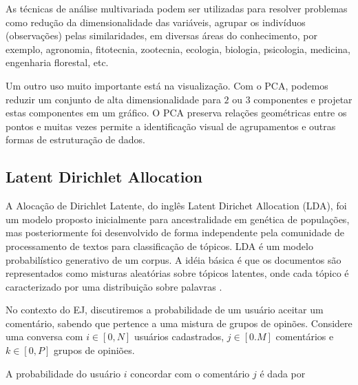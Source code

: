 
As técnicas de análise multivariada podem ser
utilizadas para resolver problemas como redução da dimensionalidade das variáveis, agrupar os
indivíduos (observações) pelas
similaridades, em diversas áreas do
conhecimento, por exemplo, agronomia,
fitotecnia, zootecnia, ecologia, biologia,
psicologia, medicina, engenharia florestal,
etc.

Um outro uso muito importante está na visualização. Com o PCA, podemos reduzir um conjunto de alta dimensionalidade para $2$ ou $3$ componentes e projetar estas componentes em um gráfico. O PCA preserva relações geométricas entre os pontos e muitas vezes permite a identificação visual de agrupamentos e outras formas de estruturação de dados.

\subsection{Latent Dirichlet Allocation}

A Alocação de Dirichlet Latente, do inglês Latent Dirichet Allocation (LDA), foi um modelo proposto inicialmente para ancestralidade em genética de populações, mas posteriormente foi desenvolvido de forma independente pela comunidade de processamento de textos para classificação de tópicos. 
LDA é um modelo probabilístico generativo de um corpus. A idéia básica é que os documentos são representados como misturas aleatórias sobre tópicos latentes, onde cada tópico é caracterizado por uma distribuição sobre palavras \cite{blei2003}.

No contexto do EJ, discutiremos a probabilidade de um usuário aceitar um comentário, sabendo que pertence a uma mistura de grupos de opinões.
Considere uma conversa com $i \in [0,N]$ usuários cadastrados, $j \in [0.M]$ comentários e $k \in [0,P]$ grupos de opiniões.

A probabilidade do usuário $i$ concordar com o comentário $j$ é dada por 

